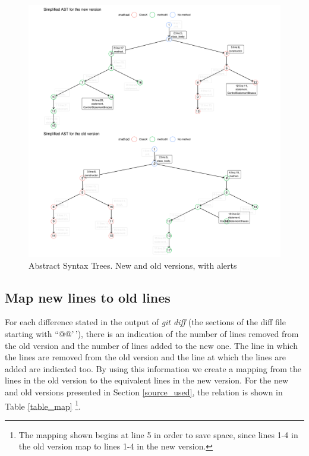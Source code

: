 \documentclass[
]{article}
\begin{document}
\begin{figure}[H]
\includegraphics[width=1\linewidth]{report_files/figure-latex/unnamed-chunk-5-1} \caption{Abstract Syntax Trees. New and old versions, with alerts \label{AST_compare_id_alerts}}\label{fig:unnamed-chunk-5}
\end{figure}

\normalsize

\subsection{Map new lines to old lines}\label{map}

For each difference stated in the output of \textit{git diff} (the
sections of the diff file starting with ``@@'\,'), there is an
indication of the number of lines removed from the old version and the
number of lines added to the new one. The line in which the lines are
removed from the old version and the line at which the lines are added
are indicated too. By using this information we create a mapping from
the lines in the old version to the equivalent lines in the new version.
For the new and old versions presented in Section \ref{source_used}, the
relation is shown in Table \ref{table_map}
\footnote{The mapping shown begins at line 5 in order to save space, since lines 1-4 in the old version map to lines 1-4 in the new version.}.
\end{document}

